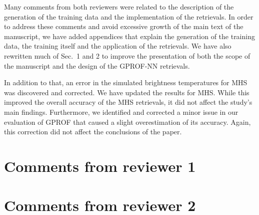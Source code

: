 \documentclass[11pt]{scrreprt}
\begin{document}
Many comments from both reviewers were related to the description of the
generation of the training data and the implementation of the retrievals. In
order to address these comments and avoid excessive growth of the main text of
the manuscript, we have added appendices that explain the generation of the
training data, the training itself and the application of the retrievals. We
have also rewritten much of Sec.~1 and 2 to improve the presentation of both the
scope of the manuscript and the design of the GPROF-NN retrievals.

In addition to that, an error in the simulated brightness temperatures for MHS
was discovered and corrected. We have updated the results for MHS.
While this improved the overall accuracy of the MHS retrievals, it did not affect the
study's main findings. Furthermore, we identified and corrected a minor issue in
our evaluation of GPROF that caused a slight overestimation of its accuracy.
Again, this correction did not affect the conclusions of the paper.


\chapter{Comments from reviewer 1}


\chapter{Comments from reviewer 2}


%



\end{document}
